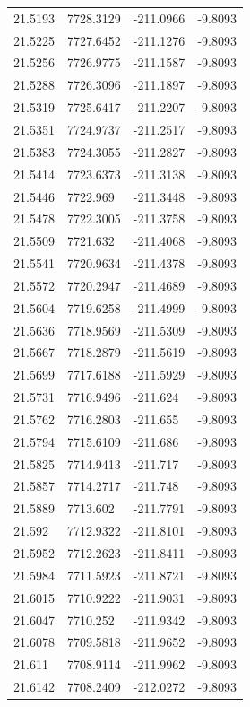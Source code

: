 \begin{table}[H]
\begin{tabular}{llll}
21.5193 & 7728.3129 & -211.0966 & -9.8093 \\
21.5225 & 7727.6452 & -211.1276 & -9.8093 \\
21.5256 & 7726.9775 & -211.1587 & -9.8093 \\
21.5288 & 7726.3096 & -211.1897 & -9.8093 \\
21.5319 & 7725.6417 & -211.2207 & -9.8093 \\
21.5351 & 7724.9737 & -211.2517 & -9.8093 \\
21.5383 & 7724.3055 & -211.2827 & -9.8093 \\
21.5414 & 7723.6373 & -211.3138 & -9.8093 \\
21.5446 & 7722.969 & -211.3448 & -9.8093 \\
21.5478 & 7722.3005 & -211.3758 & -9.8093 \\
21.5509 & 7721.632 & -211.4068 & -9.8093 \\
21.5541 & 7720.9634 & -211.4378 & -9.8093 \\
21.5572 & 7720.2947 & -211.4689 & -9.8093 \\
21.5604 & 7719.6258 & -211.4999 & -9.8093 \\
21.5636 & 7718.9569 & -211.5309 & -9.8093 \\
21.5667 & 7718.2879 & -211.5619 & -9.8093 \\
21.5699 & 7717.6188 & -211.5929 & -9.8093 \\
21.5731 & 7716.9496 & -211.624 & -9.8093 \\
21.5762 & 7716.2803 & -211.655 & -9.8093 \\
21.5794 & 7715.6109 & -211.686 & -9.8093 \\
21.5825 & 7714.9413 & -211.717 & -9.8093 \\
21.5857 & 7714.2717 & -211.748 & -9.8093 \\
21.5889 & 7713.602 & -211.7791 & -9.8093 \\
21.592 & 7712.9322 & -211.8101 & -9.8093 \\
21.5952 & 7712.2623 & -211.8411 & -9.8093 \\
21.5984 & 7711.5923 & -211.8721 & -9.8093 \\
21.6015 & 7710.9222 & -211.9031 & -9.8093 \\
21.6047 & 7710.252 & -211.9342 & -9.8093 \\
21.6078 & 7709.5818 & -211.9652 & -9.8093 \\
21.611 & 7708.9114 & -211.9962 & -9.8093 \\
21.6142 & 7708.2409 & -212.0272 & -9.8093 \\

\end{tabular}
\end{table}
